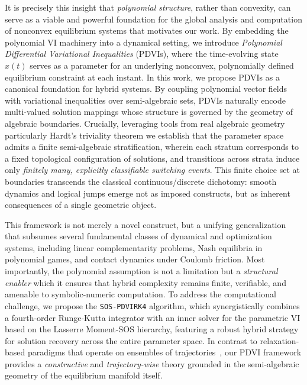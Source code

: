 \documentclass[sn-basic,Numbered]{sn-jnl}
\theoremstyle{thmstyleone}%
\begin{document}
It is precisely this insight that \emph{polynomial structure}, rather than convexity, can serve as a viable and powerful foundation for the global analysis and computation of nonconvex equilibrium systems that motivates our work. By embedding the polynomial VI machinery into a dynamical setting, we introduce \emph{Polynomial Differential Variational Inequalities} (PDVIs), where the time-evolving state 
$x(t)$ serves as a parameter for an underlying nonconvex, polynomially defined equilibrium constraint at each instant.
In this work, we propose PDVIs as a canonical foundation for hybrid systems. By coupling polynomial vector fields with variational inequalities over semi-algebraic sets, PDVIs naturally encode multi-valued solution mappings whose structure is governed by the geometry of algebraic boundaries. Crucially, leveraging tools from real algebraic geometry particularly Hardt’s triviality theorem we establish that the parameter space admits a finite semi-algebraic stratification, wherein each stratum corresponds to a fixed topological configuration of solutions, and transitions across strata induce only \emph{finitely many, explicitly classifiable switching events}. This finite choice set at boundaries transcends the classical continuous/discrete dichotomy: smooth dynamics and logical jumps emerge not as imposed constructs, but as inherent consequences of a single geometric object.

This framework is not merely a novel construct, but a unifying generalization that subsumes several fundamental classes of dynamical and optimization systems, including linear complementarity problems, Nash equilibria in polynomial games, and contact dynamics under Coulomb friction. Most importantly, the polynomial assumption is not a limitation but a \emph{structural enabler} which it ensures that hybrid complexity remains finite, verifiable, and amenable to symbolic-numeric computation. To address the computational challenge, we propose the \texttt{SOS-PDVIRK4} algorithm, which synergistically combines a fourth-order Runge-Kutta integrator with an inner solver for the parametric VI based on the Lasserre Moment-SOS hierarchy, featuring a robust hybrid strategy for solution recovery across the entire parameter space. In contrast to relaxation-based paradigms that operate on ensembles of trajectories~\cite{Claeys2016,Magron2019}, our PDVI framework provides a \emph{constructive} and \emph{trajectory-wise} theory grounded in the semi-algebraic geometry of the equilibrium manifold itself.
\end{document}
